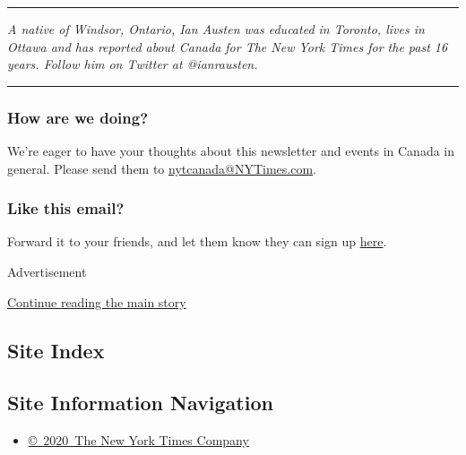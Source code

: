 \begin{center}\rule{0.5\linewidth}{\linethickness}\end{center}

\emph{A native of Windsor, Ontario, Ian Austen was educated in Toronto,
lives in Ottawa and has reported about Canada for The New York Times for
the past 16 years. Follow him on Twitter at @ianrausten.}

\begin{center}\rule{0.5\linewidth}{\linethickness}\end{center}

\hypertarget{how-are-we-doing}{%
\subsubsection{\texorpdfstring{\textbf{How are we
doing?}}{How are we doing?}}\label{how-are-we-doing}}

We're eager to have your thoughts about this newsletter and events in
Canada in general. Please send them to
\href{mailto:nytcanada@NYTimes.com?\%20subject=Canada\%20Letter\%20Newsletter\%20Feedback}{nytcanada@NYTimes.com}.

\hypertarget{like-this-email}{%
\subsubsection{\texorpdfstring{\textbf{Like this
email?}}{Like this email?}}\label{like-this-email}}

Forward it to your friends, and let them know they can sign up
\href{https://www.nytimes3xbfgragh.onion/newsletters/canada-letter?smid=nytemail\&smvar=canadaletter\&te=1\&nl=canada-today\&emc=edit_cnda_20190622}{here}.

Advertisement

\protect\hyperlink{after-bottom}{Continue reading the main story}

\hypertarget{site-index}{%
\subsection{Site Index}\label{site-index}}

\hypertarget{site-information-navigation}{%
\subsection{Site Information
Navigation}\label{site-information-navigation}}

\begin{itemize}
\tightlist
\item
  \href{https://help.nytimes3xbfgragh.onion/hc/en-us/articles/115014792127-Copyright-notice}{©~2020~The
  New York Times Company}
\end{itemize}

